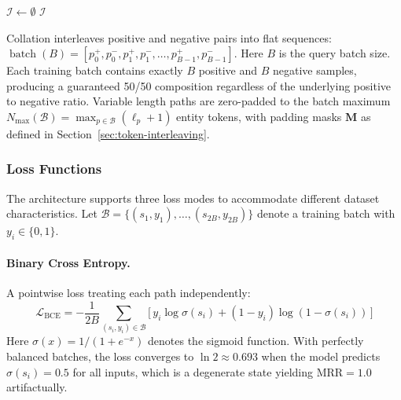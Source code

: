 \begin{algorithm}[htbp]
\caption{Paired-Sampling Dataset Construction}
\label{alg:paired}

$\mathcal{I} \gets \emptyset$\;
\Return $\mathcal{I}$\;
\end{algorithm}

Collation interleaves positive and negative pairs into flat sequences:
$\operatorname{batch}(B) = [p^+_0, p^-_0, p^+_1, p^-_1, \ldots, p^+_{B-1}, p^-_{B-1}]$.
Here $B$ is the query batch size.  Each training batch contains exactly $B$ positive and
$B$ negative samples, producing a guaranteed 50/50 composition regardless of the underlying
positive to negative ratio.  Variable length paths are zero-padded to the batch maximum
$N_{\max}(\mathcal{B}) = \max_{p \in \mathcal{B}} (\ell_p + 1)$ entity tokens, with
padding masks $\mathbf{M}$ as defined in Section~\ref{sec:token-interleaving}.

\vspace{-1em}
\subsubsection{Loss Functions}
\vspace{-1em}
\label{sec:loss-functions}

The architecture supports three loss modes to accommodate different dataset
characteristics.  Let $\mathcal{B} = \{(s_1, y_1), \ldots, (s_{2B}, y_{2B})\}$
denote a training batch with $y_i \in \{0, 1\}$.

\vspace{-1em}
\paragraph{Binary Cross Entropy.}  A pointwise loss treating each path independently:
\begin{equation}
\mathcal{L}_{\text{BCE}} = -\frac{1}{2B} \sum_{(s_i, y_i) \in \mathcal{B}}
    \bigl[\, y_i \log \sigma(s_i) + (1 - y_i) \log(1 - \sigma(s_i)) \,\bigr]
\label{eq:loss-bce}
\end{equation}
Here $\sigma(x) = 1/(1 + e^{-x})$ denotes the sigmoid function.  With perfectly balanced batches,
the loss converges to $\ln 2 \approx 0.693$ when the model predicts $\sigma(s_i) = 0.5$
for all inputs, which is a degenerate state yielding $\mathrm{MRR}=1.0$ artifactually.

